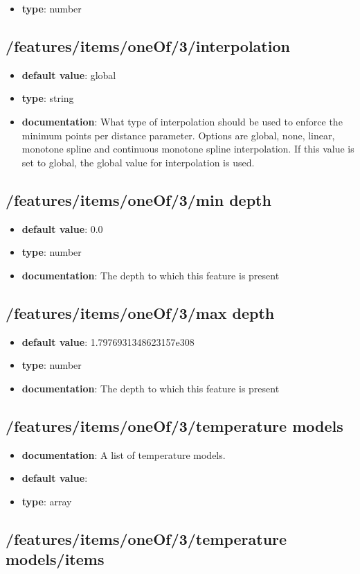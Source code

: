 \begin{itemize}\item {\bf type}: number
\end{itemize}\subsection{/features/items/oneOf/3/interpolation}
\begin{itemize}\item {\bf default value}: global
\item {\bf type}: string
\item {\bf documentation}: What type of interpolation should be used to enforce the minimum points per distance parameter. Options are global, none, linear, monotone spline and continuous monotone spline interpolation. If this value is set to global, the global value for interpolation is used.
\end{itemize}\subsection{/features/items/oneOf/3/min depth}
\begin{itemize}\item {\bf default value}: 0.0
\item {\bf type}: number
\item {\bf documentation}: The depth to which this feature is present
\end{itemize}\subsection{/features/items/oneOf/3/max depth}
\begin{itemize}\item {\bf default value}: 1.7976931348623157e308
\item {\bf type}: number
\item {\bf documentation}: The depth to which this feature is present
\end{itemize}\subsection{/features/items/oneOf/3/temperature models}
\begin{itemize}\item {\bf documentation}: A list of temperature models.
\item {\bf default value}: 
\item {\bf type}: array
\end{itemize}\subsection{/features/items/oneOf/3/temperature models/items}

